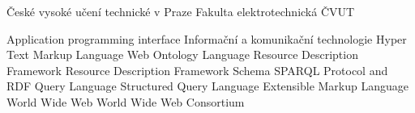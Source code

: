    {České vysoké učení technické v Praze}                          
    {Fakulta elektrotechnická ČVUT}

 {Application programming interface}
 {Informační a komunikační technologie}
 {Hyper Text Markup Language}
 {Web Ontology Language}
 {Resource Description Framework}
 {Resource Description Framework Schema}
 {SPARQL Protocol and RDF Query Language}
 {Structured Query Language}
 {Extensible Markup Language}
 {World Wide Web}
 {World Wide Web Consortium}
